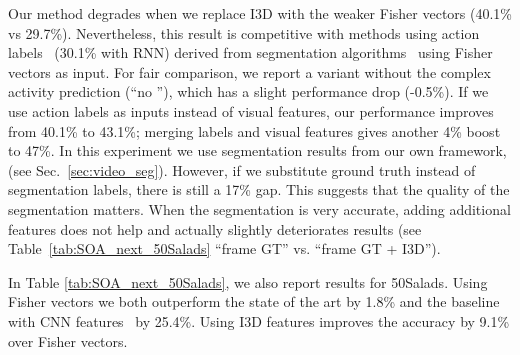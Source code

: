 \documentclass[runningheads]{llncs}
\begin{document}
Our method degrades when we replace I3D with the weaker Fisher vectors (40.1\% vs 29.7\%). Nevertheless, this result is competitive with methods using action labels~\cite{abu2018will} (30.1\% with RNN) derived from segmentation algorithms~\cite{richard2017weakly} using Fisher vectors as input. For fair comparison, we report a variant without the complex activity prediction (``no ''), which has a slight performance drop (-0.5\%).  If we use action labels as inputs instead of visual features, our performance improves from 40.1\% to 43.1\%; merging labels and visual features gives another 4\% boost to 47\%. In this experiment we use segmentation results from our own framework,  
(see Sec.~\ref{sec:video_seg}). However, if we substitute ground truth instead of segmentation labels, there is still a 17\% gap. This suggests that the quality of the segmentation matters. When the segmentation is very accurate, adding additional features does not help and actually slightly deteriorates results (see Table~\ref{tab:SOA_next_50Salads} ``frame GT'' vs. ``frame GT + I3D'').

In Table \ref{tab:SOA_next_50Salads}, we also report results for 50Salads. Using Fisher vectors we both outperform the state of the art by 1.8\% and the baseline with CNN features~\cite{vondrick2016anticipating} by 25.4\%. Using I3D features improves the accuracy by 9.1\% over Fisher vectors.
\end{document}
